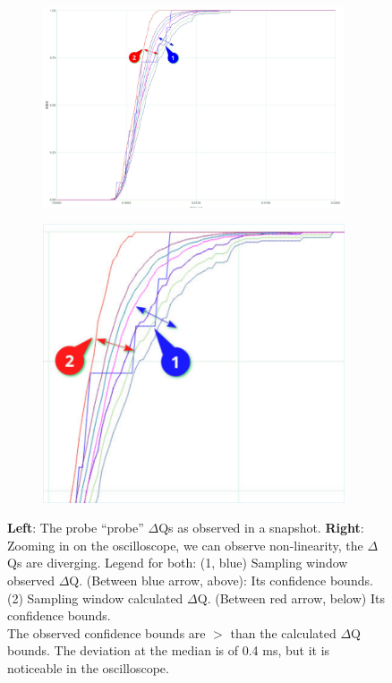        \begin{figure}[H]
            \centering
            \begin{subfigure}{.5\textwidth}
                \centering
                \includegraphics[width=0.98\textwidth]{img/overload_2/150_probe2.pdf}
                \label{fig:ovuvv}
            \end{subfigure}%
            \begin{subfigure}{.5\textwidth}
                \centering
                \includegraphics[width =0.98\textwidth]{img/overload_2/150_probe2zoom_cropped.pdf}
                \label{fig:ovovv}
            \end{subfigure}
            \caption{\textbf{Left}: The probe ``probe'' $\Delta$Qs as observed in a snapshot. \textbf{Right}: Zooming in on the oscilloscope, we can observe non-linearity, the $\Delta$Qs are diverging. Legend for both: (1, blue) Sampling window observed $\Delta$Q. (Between blue arrow, above): Its confidence bounds. (2) Sampling window calculated $\Delta$Q. (Between red arrow, below) Its confidence bounds. \\ The observed confidence bounds are $>$ than the calculated $\Delta$Q bounds. The deviation at the median is of 0.4 ms, but it is noticeable in the oscilloscope.}
            \label{fig:avavv} 
        \end{figure}
       
